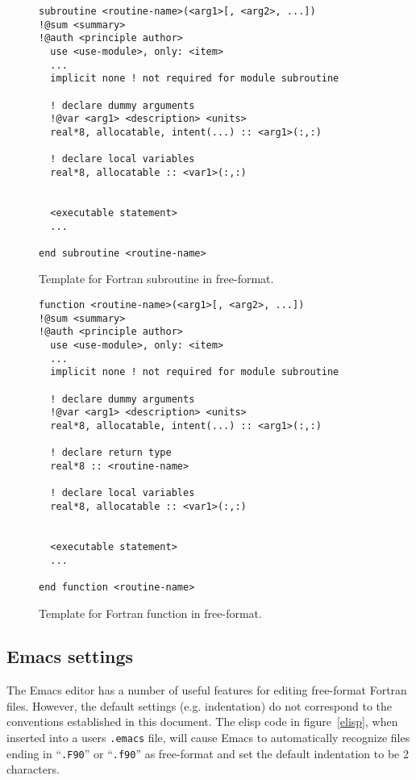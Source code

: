 \documentclass{article}
\begin{document}
\begin{figure}[h]
\begin{boxedminipage}[t]{4.8in}
\begin{verbatim}
subroutine <routine-name>(<arg1>[, <arg2>, ...])
!@sum <summary>
!@auth <principle author>
  use <use-module>, only: <item>
  ...
  implicit none ! not required for module subroutine

  ! declare dummy arguments
  !@var <arg1> <description> <units>
  real*8, allocatable, intent(...) :: <arg1>(:,:)

  ! declare local variables
  real*8, allocatable :: <var1>(:,:)


  <executable statement>
  ...

end subroutine <routine-name>
\end{verbatim}
\end{boxedminipage}
\caption{Template for Fortran subroutine in free-format.}
\label{subroutine-template}
\end{figure}


\begin{figure}[h]
\begin{boxedminipage}[t]{4.8in}
\begin{verbatim}
function <routine-name>(<arg1>[, <arg2>, ...])
!@sum <summary>
!@auth <principle author>
  use <use-module>, only: <item>
  ...
  implicit none ! not required for module subroutine

  ! declare dummy arguments
  !@var <arg1> <description> <units>
  real*8, allocatable, intent(...) :: <arg1>(:,:)

  ! declare return type
  real*8 :: <routine-name>

  ! declare local variables
  real*8, allocatable :: <var1>(:,:)


  <executable statement>
  ...

end function <routine-name>
\end{verbatim}
\end{boxedminipage}
\caption{Template for Fortran function in free-format.}
\label{function-template}
\end{figure}

\clearpage

\subsection {Emacs settings}

The Emacs editor has a number of useful features for editing
free-format Fortran files.  However, the default settings
(e.g. indentation) do not correspond to the conventions established in
this document.  The elisp code in figure~\ref{elisp}, when inserted
into a users {\tt .emacs} file, will cause Emacs to automatically
recognize files ending in ``{\tt .F90}'' or ``{\tt .f90}'' as
free-format and set the default indentation to be 2 characters.
\end{document}
